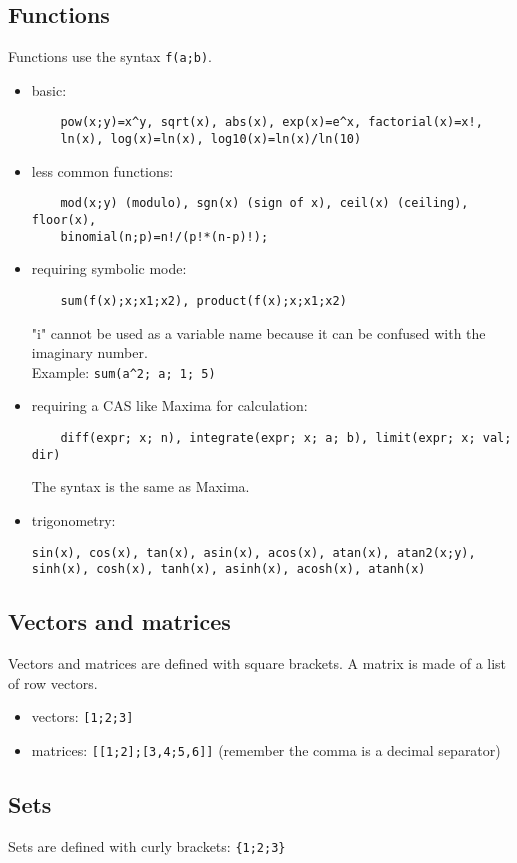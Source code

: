 \subsection{Functions}
Functions use the syntax \texttt{f(a;b)}.
\begin{itemize}
\item basic:
\begin{verbatim}
    pow(x;y)=x^y, sqrt(x), abs(x), exp(x)=e^x, factorial(x)=x!,
    ln(x), log(x)=ln(x), log10(x)=ln(x)/ln(10)
\end{verbatim}
\item less common functions:
\begin{verbatim}
    mod(x;y) (modulo), sgn(x) (sign of x), ceil(x) (ceiling), floor(x),
    binomial(n;p)=n!/(p!*(n-p)!);
\end{verbatim}
\item requiring symbolic mode:
\begin{verbatim}
    sum(f(x);x;x1;x2), product(f(x);x;x1;x2)
\end{verbatim}
"i" cannot be used as a variable name because it can be confused with the imaginary number.\\
Example: \texttt{sum(a\^{}2; a; 1; 5)}
\item requiring a CAS like Maxima for calculation:
\begin{verbatim}
    diff(expr; x; n), integrate(expr; x; a; b), limit(expr; x; val; dir)
\end{verbatim}
The syntax is the same as Maxima.
\item trigonometry:
\begin{verbatim}
sin(x), cos(x), tan(x), asin(x), acos(x), atan(x), atan2(x;y),
sinh(x), cosh(x), tanh(x), asinh(x), acosh(x), atanh(x)
\end{verbatim}
\end{itemize}

\subsection{Vectors and matrices}
Vectors and matrices are defined with square brackets. A matrix is made of a list of row vectors.
\begin{itemize}
\item vectors: \texttt{[1;2;3]}
\item matrices: \texttt{[[1;2];[3,4;5,6]]}
(remember the comma is a decimal separator)
\end{itemize}

\subsection{Sets}
Sets are defined with curly brackets: \texttt{\{1;2;3\}}

